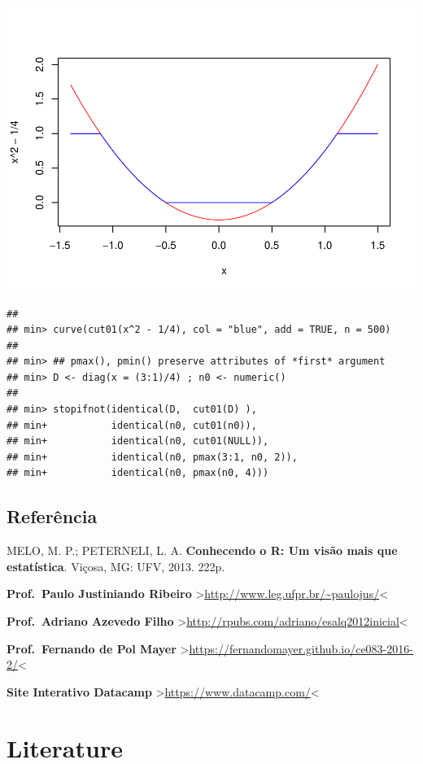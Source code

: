 \documentclass[]{book}
\begin{document}
\includegraphics{TudodoR_files/figure-latex/unnamed-chunk-14-2.pdf}

\begin{verbatim}
## 
## min> curve(cut01(x^2 - 1/4), col = "blue", add = TRUE, n = 500)
## 
## min> ## pmax(), pmin() preserve attributes of *first* argument
## min> D <- diag(x = (3:1)/4) ; n0 <- numeric()
## 
## min> stopifnot(identical(D,  cut01(D) ),
## min+           identical(n0, cut01(n0)),
## min+           identical(n0, cut01(NULL)),
## min+           identical(n0, pmax(3:1, n0, 2)),
## min+           identical(n0, pmax(n0, 4)))
\end{verbatim}

\hypertarget{referencia}{%
\section{Referência}\label{referencia}}

MELO, M. P.; PETERNELI, L. A. \textbf{Conhecendo o R: Um visão mais que estatística}. Viçosa, MG: UFV, 2013. 222p.

\textbf{Prof.~Paulo Justiniando Ribeiro} \textgreater{}\url{http://www.leg.ufpr.br/~paulojus/}\textless{}

\textbf{Prof.~Adriano Azevedo Filho} \textgreater{}\url{http://rpubs.com/adriano/esalq2012inicial}\textless{}

\textbf{Prof.~Fernando de Pol Mayer} \textgreater{}\url{https://fernandomayer.github.io/ce083-2016-2/}\textless{}

\textbf{Site Interativo Datacamp} \textgreater{}\url{https://www.datacamp.com/}\textless{}

\hypertarget{literature}{%
\chapter{Literature}\label{literature}}
\end{document}
